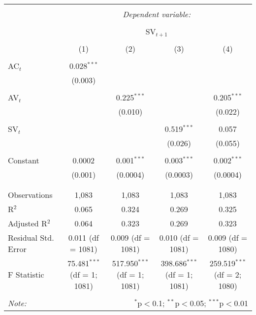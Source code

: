 
\begin{table}[!htbp] \centering 
  \caption{} 
  \label{} 
\begin{tabular}{@{\extracolsep{5pt}}lcccc} 
\\[-1.8ex]\hline 
\hline \\[-1.8ex] 
 & \multicolumn{4}{c}{\textit{Dependent variable:}} \\ 
\cline{2-5} 
\\[-1.8ex] & \multicolumn{4}{c}{SV$_{t+1}$} \\ 
\\[-1.8ex] & (1) & (2) & (3) & (4)\\ 
\hline \\[-1.8ex] 
 AC$_{t}$ & 0.028$^{***}$ &  &  &  \\ 
  & (0.003) &  &  &  \\ 
  & & & & \\ 
 AV$_{t}$ &  & 0.225$^{***}$ &  & 0.205$^{***}$ \\ 
  &  & (0.010) &  & (0.022) \\ 
  & & & & \\ 
 SV$_{t}$ &  &  & 0.519$^{***}$ & 0.057 \\ 
  &  &  & (0.026) & (0.055) \\ 
  & & & & \\ 
 Constant & 0.0002 & 0.001$^{***}$ & 0.003$^{***}$ & 0.002$^{***}$ \\ 
  & (0.001) & (0.0004) & (0.0003) & (0.0004) \\ 
  & & & & \\ 
\hline \\[-1.8ex] 
Observations & 1,083 & 1,083 & 1,083 & 1,083 \\ 
R$^{2}$ & 0.065 & 0.324 & 0.269 & 0.325 \\ 
Adjusted R$^{2}$ & 0.064 & 0.323 & 0.269 & 0.323 \\ 
Residual Std. Error & 0.011 (df = 1081) & 0.009 (df = 1081) & 0.010 (df = 1081) & 0.009 (df = 1080) \\ 
F Statistic & 75.481$^{***}$ (df = 1; 1081) & 517.950$^{***}$ (df = 1; 1081) & 398.686$^{***}$ (df = 1; 1081) & 259.519$^{***}$ (df = 2; 1080) \\ 
\hline 
\hline \\[-1.8ex] 
\textit{Note:}  & \multicolumn{4}{r}{$^{*}$p$<$0.1; $^{**}$p$<$0.05; $^{***}$p$<$0.01} \\ 
\end{tabular} 
\end{table} 
